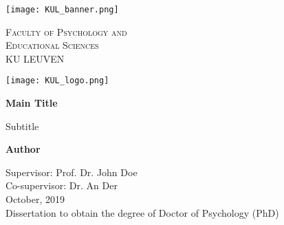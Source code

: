 \begin{titlepage}
    \begin{center}
     
       \texttt{[image: KUL\_banner.png]}%
       
       \vspace*{0.5cm}

        \textsc{Faculty of Psychology and}\\
        \textsc{Educational Sciences}\\ 
        KU LEUVEN\\
        
         \vspace*{0.7cm}

		\texttt{[image: KUL\_logo.png]}
		
		 \vspace*{0.5cm}

 
        \Huge
        \textbf{Main Title}
 
        \vspace{0.5cm}
        \LARGE
        Subtitle
 
        \vspace{1.5cm}
 
        \textbf{Author}
 
        \vfill
 
        \vspace{0.8cm}
  
        \Large
        Supervisor: Prof. Dr. John Doe\\
        Co-supervisor: Dr. An Der\\[1\baselineskip]
      
        October, 2019\\[2\baselineskip]
        
                
        \large
        Dissertation to obtain the degree of Doctor of Psychology (PhD)\\
 
    \end{center}
\end{titlepage}
